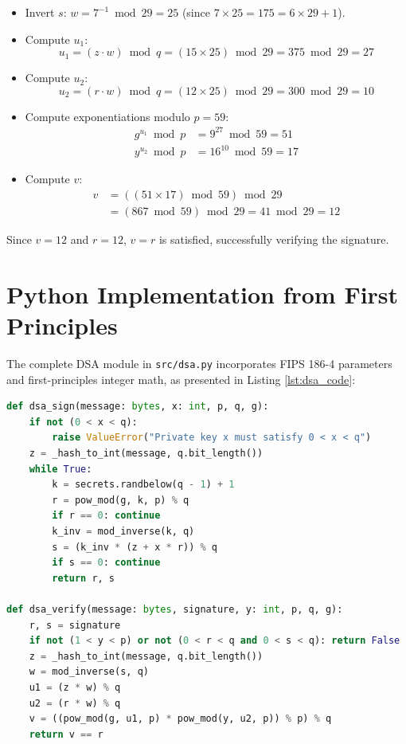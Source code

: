 \begin{enumerate}
\begin{itemize}
        \item Invert $s$: $w = 7^{-1} \bmod 29 = 25$ (since $7 \times 25 = 175 = 6 \times 29 + 1$).
        \item Compute $u_1$:
        \begin{equation}
        u_1 = (z \cdot w) \bmod q = (15 \times 25) \bmod 29 = 375 \bmod 29 = 27
        \end{equation}
        \item Compute $u_2$:
        \begin{equation}
        u_2 = (r \cdot w) \bmod q = (12 \times 25) \bmod 29 = 300 \bmod 29 = 10
        \end{equation}
        \item Compute exponentiations modulo $p = 59$:
        \begin{align*}
        g^{u_1} \bmod p &= 9^{27} \bmod 59 = 51 \\
        y^{u_2} \bmod p &= 16^{10} \bmod 59 = 17
        \end{align*}
        \item Compute $v$:
        \begin{equation}
        \begin{aligned}
        v &= ((51 \times 17) \bmod 59) \bmod 29 \\
          &= (867 \bmod 59) \bmod 29 = 41 \bmod 29 = 12
        \end{aligned}
        \end{equation}
    \end{itemize}
    Since $v = 12$ and $r = 12$, $v = r$ is satisfied, successfully verifying the signature.
\end{enumerate}

\clearpage
\section{Python Implementation from First Principles}
The complete DSA module in \texttt{src/dsa.py} incorporates FIPS 186-4 parameters and first-principles integer math, as presented in Listing \ref{lst:dsa_code}:
\begin{lstlisting}[language=Python, caption={Core DSA Signing and Verification routines.}, label={lst:dsa_code}]
def dsa_sign(message: bytes, x: int, p, q, g):
    if not (0 < x < q):
        raise ValueError("Private key x must satisfy 0 < x < q")
    z = _hash_to_int(message, q.bit_length())
    while True:
        k = secrets.randbelow(q - 1) + 1
        r = pow_mod(g, k, p) % q
        if r == 0: continue
        k_inv = mod_inverse(k, q)
        s = (k_inv * (z + x * r)) % q
        if s == 0: continue
        return r, s

def dsa_verify(message: bytes, signature, y: int, p, q, g):
    r, s = signature
    if not (1 < y < p) or not (0 < r < q and 0 < s < q): return False
    z = _hash_to_int(message, q.bit_length())
    w = mod_inverse(s, q)
    u1 = (z * w) % q
    u2 = (r * w) % q
    v = ((pow_mod(g, u1, p) * pow_mod(y, u2, p)) % p) % q
    return v == r
\end{lstlisting}

